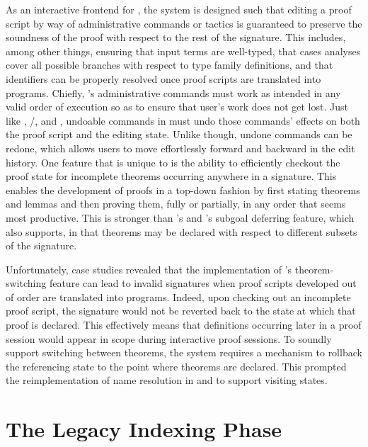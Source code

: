 As an interactive frontend for \Beluga, the \Harpoon system is designed such that editing a proof script by way of administrative commands or tactics is guaranteed to preserve the soundness of the proof with respect to the rest of the \Beluga signature.
This includes, among other things, ensuring that input terms are well-typed, that cases analyses cover all possible branches with respect to type family definitions, and that identifiers can be properly resolved once proof scripts are translated into programs.
Chiefly, \Harpoon's administrative commands must work as intended in any valid order of execution so as to ensure that user's work does not get lost.
Just like \Abella, \Isabelle/\Isar, \Coq and \Agda, undoable commands in \Harpoon must undo those commands' effects on both the proof script and the editing state.
Unlike \Abella though, undone commands can be redone, which allows users to move effortlessly forward and backward in the edit history.
One feature that is unique to \Harpoon is the ability to efficiently checkout the proof state for incomplete theorems occurring anywhere in a \Beluga signature.
This enables the development of proofs in a top-down fashion by first stating theorems and lemmas and then proving them, fully or partially, in any order that seems most productive.
This is stronger than \Abella's and \Coq's subgoal deferring feature, which \Harpoon also supports, in that theorems may be declared with respect to different subsets of the signature.

Unfortunately, case studies revealed that the implementation of \Harpoon's theorem-switching feature can lead to invalid \Beluga signatures when proof scripts developed out of order are translated into programs.
Indeed, upon checking out an incomplete proof script, the signature would not be reverted back to the state at which that proof is declared.
This effectively means that definitions occurring later in a proof session would appear in scope during interactive proof sessions.
To soundly support switching between theorems, the \Beluga system requires a mechanism to rollback the referencing state to the point where theorems are declared.
This prompted the reimplementation of name resolution in \Beluga and \Harpoon to support visiting states.

\section{The Legacy Indexing Phase}


